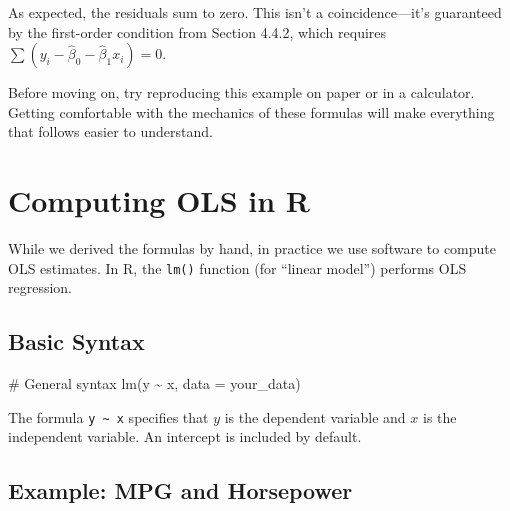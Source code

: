 \documentclass[
  letterpaper,
  DIV=11,
  numbers=noendperiod]{scrreprt}
\newenvironment{Shaded}{\begin{snugshade}}{\end{snugshade}}
\newcommand{\AttributeTok}[1]{\textcolor[rgb]{0.40,0.45,0.13}{#1}}
\newcommand{\CommentTok}[1]{\textcolor[rgb]{0.37,0.37,0.37}{#1}}
\newcommand{\FunctionTok}[1]{\textcolor[rgb]{0.28,0.35,0.67}{#1}}
\newcommand{\NormalTok}[1]{\textcolor[rgb]{0.00,0.23,0.31}{#1}}
\newcommand{\SpecialCharTok}[1]{\textcolor[rgb]{0.37,0.37,0.37}{#1}}
\begin{document}
As expected, the residuals sum to zero. This isn't a coincidence---it's
guaranteed by the first-order condition from Section 4.4.2, which
requires \(\sum(y_i - \hat{\beta}_0 - \hat{\beta}_1 x_i) = 0\).

\begin{tcolorbox}[enhanced jigsaw, arc=.35mm, bottomrule=.15mm, bottomtitle=1mm, breakable, colback=white, colbacktitle=quarto-callout-tip-color!10!white, colframe=quarto-callout-tip-color-frame, coltitle=black, left=2mm, leftrule=.75mm, opacityback=0, opacitybacktitle=0.6, rightrule=.15mm, title=\textcolor{quarto-callout-tip-color}{\faLightbulb}\hspace{0.5em}{Try It Yourself}, titlerule=0mm, toprule=.15mm, toptitle=1mm]

Before moving on, try reproducing this example on paper or in a
calculator. Getting comfortable with the mechanics of these formulas
will make everything that follows easier to understand.

\end{tcolorbox}

\section{Computing OLS in R}\label{computing-ols-in-r}

While we derived the formulas by hand, in practice we use software to
compute OLS estimates. In R, the \texttt{lm()} function (for ``linear
model'') performs OLS regression.

\subsection{Basic Syntax}\label{basic-syntax}

\begin{Shaded}
\begin{Highlighting}[]
\CommentTok{\# General syntax}
\FunctionTok{lm}\NormalTok{(y }\SpecialCharTok{\textasciitilde{}}\NormalTok{ x, }\AttributeTok{data =}\NormalTok{ your\_data)}
\end{Highlighting}
\end{Shaded}

The formula \texttt{y\ \textasciitilde{}\ x} specifies that \(y\) is the
dependent variable and \(x\) is the independent variable. An intercept
is included by default.

\subsection{Example: MPG and
Horsepower}\label{example-mpg-and-horsepower}
\end{document}
